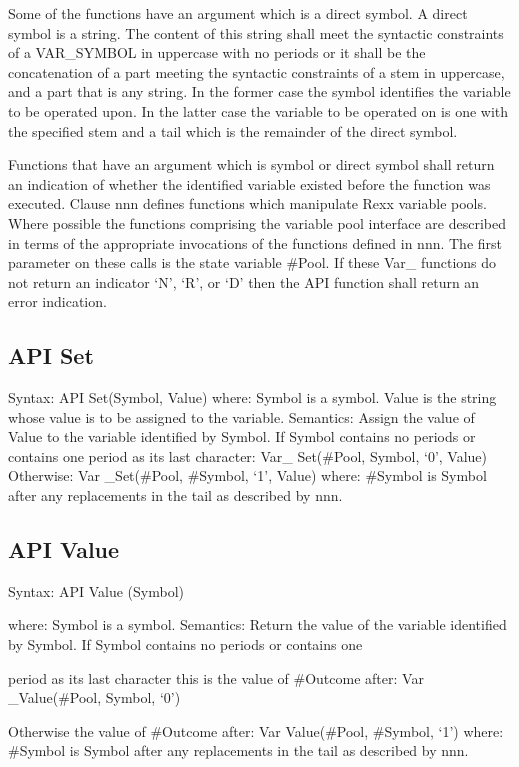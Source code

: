 Some of the functions have an argument which is a direct symbol. A
direct symbol is a string. The content of this string shall meet the
syntactic constraints of a VAR\_SYMBOL in uppercase with no periods or
it shall be the concatenation of a part meeting the syntactic
constraints of a stem in uppercase, and a part that is any string. In
the former case the symbol identifies the variable to be operated upon.
In the latter case the variable to be operated on is one with the
specified stem and a tail which is the remainder of the direct symbol.

Functions that have an argument which is symbol or direct symbol shall
return an indication of whether the identified variable existed before
the function was executed. Clause nnn defines functions which manipulate
Rexx variable pools. Where possible the functions comprising the
variable pool interface are described in terms of the appropriate
invocations of the functions defined in nnn. The first parameter on
these calls is the state variable \#Pool. If these Var\_ functions do
not return an indicator `N', `R', or `D' then the API function shall
return an error indication.

\subsection{API Set}\label{api-set}

Syntax: API Set(Symbol, Value) where: Symbol is a symbol. Value is the
string whose value is to be assigned to the variable. Semantics: Assign
the value of Value to the variable identified by Symbol. If Symbol
contains no periods or contains one period as its last character: Var\_
Set(\#Pool, Symbol, `0', Value) Otherwise: Var \_Set(\#Pool, \#Symbol,
`1', Value) where: \#Symbol is Symbol after any replacements in the tail
as described by nnn.

\subsection{API Value}\label{api-value}

Syntax: API Value (Symbol)

where: Symbol is a symbol. Semantics: Return the value of the variable
identified by Symbol. If Symbol contains no periods or contains one

period as its last character this is the value of \#Outcome after: Var
\_Value(\#Pool, Symbol, `0')

Otherwise the value of \#Outcome after: Var Value(\#Pool, \#Symbol, `1')
where: \#Symbol is Symbol after any replacements in the tail as
described by nnn.

